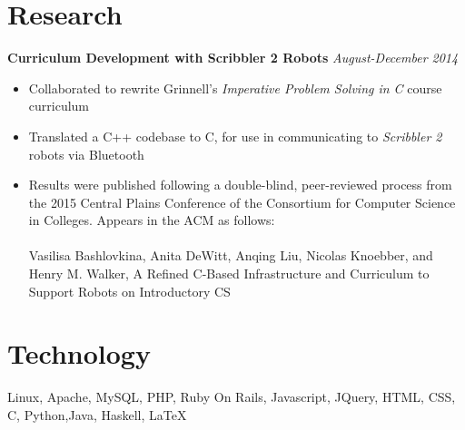 \documentclass[10pt]{article}
\begin{document}
 
\section{Research}
\textbf{Curriculum Development with Scribbler 2 Robots} \hfill \emph{August-December 2014}
\begin{itemize}[noitemsep,nolistsep]
    \item Collaborated to rewrite Grinnell's \emph{Imperative Problem Solving in C} course curriculum
    \item Translated a C++ codebase to C, for use in communicating to \emph{Scribbler 2} robots via Bluetooth
    \item Results were published following a double-blind, peer-reviewed process from the 2015 Central Plains Conference of the Consortium for Computer Science in Colleges. Appears in the ACM as follows:\\\\
    Vasilisa Bashlovkina, Anita DeWitt, Anqing Liu, Nicolas Knoebber, and Henry M. Walker, A Refined C-Based Infrastructure and Curriculum to Support Robots on Introductory CS
\end{itemize}
\section{Technology}
Linux, Apache, MySQL, PHP, Ruby On Rails, Javascript, JQuery, HTML, CSS, C, Python,Java, Haskell, \LaTeX\\
\end{document}
